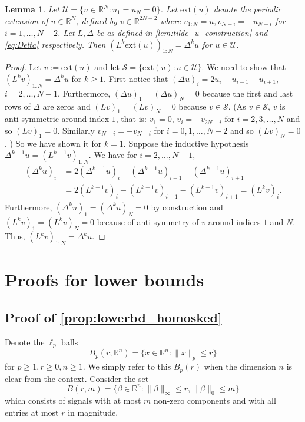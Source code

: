 \documentclass[ejs,noshowframe]{imsart}
\theoremstyle{plain}
\newtheorem{lemma}[theorem]{Lemma}
\theoremstyle{definition}
\newcommand{\R}{\mathbb{R}}
\newcommand{\cS}{\mathcal{S}}
\newcommand{\cU}{\mathcal{U}}
\begin{document}
\begin{appendix}
\begin{lemma}
	\label{lem:L_Delta_on_U}
	Let $\cU = \{ u \in \R^N: u_1 = u_N = 0 \}$.
	Let $\mathrm{ext}(u)$ denote the periodic extension of $u \in \R^N$,
	defined by $v \in \R^{2N-2}$ where $ v_{1:N} = u, v_{N+i} = -u_{N-i}$ for 
	$i=1,\dots,N-2$.
	Let $L, \Delta$ be as defined in \autoref{lem:tilde_u_construction} and 
	\eqref{eq:Delta} respectively.
	Then $(L^k \mathrm{ext}(u))_{1:N} = \Delta^k u$ for $u \in \cU$.
\end{lemma}
\begin{proof}
	Let $v := \mathrm{ext}(u)$ and let $\cS = \{ \mathrm{ext}(u) : u \in \cU\}$.
	We need to show that $(L^k v)_{1:N} = \Delta^k u$ 
	for $k \ge 1$.
	First notice that $(\Delta u)_i = 2u_i - u_{i-1} 
	- u_{i+1}$, $i=2,\ldots, N-1$.
	Furthermore, $(\Delta u)_1 = (\Delta u)_{N} = 0$ because the first and last 
	rows of $\Delta$ are zeros
	and $(Lv)_1 = (Lv)_N = 0$ because $v \in \cS$.
	(As $v \in \cS$, $v$ is anti-symmetric around index $1$, that is:
		$v_1 = 0$, $v_{i} = -v_{2N-i}$ for $i=2,3,\dots, N$ and so $(Lv)_1 = 0$.
		Similarly 
		$v_{N-i} = -v_{N+i}$ for $i=0, 1,\dots, N-2$ and so $(Lv)_{N} = 0$.
	)
	So we have shown it for $k=1$.
	Suppose the inductive hypothesis $\Delta^{k-1}  u = (L^{k-1} v)_{1:N}$.
	We have for $i=2,\ldots, N-1$,
	\begin{align}
	(\Delta^{k}  u)_i 
	&= 2(\Delta^{k-1} u)_i - (\Delta^{k-1} u)_{i-1} - (\Delta^{k-1} u)_{i+1} \\
	&= 2 (L^{k-1} v)_i - (L^{k-1} v)_{i-1} - (L^{k-1} v)_{i+1}  
	= (L^k v)_i.
	\end{align}
	Furthermore, $(\Delta^k u)_1 = (\Delta^k u)_N = 0$ by construction
	and $(L^k v)_1 = (L^k v)_N = 0$ because of anti-symmetry of $v$ around 
	indices $1$ and $N$.
	Thus, $(L^k v)_{1:N} = \Delta^k u$.
\end{proof}
\section{Proofs for lower bounds}

\subsection{Proof of \autoref{prop:lowerbd_homosked}}
\label{sec:lowerbd_homosked_proof}
Denote the $\ell_p$ balls
\begin{equation}
	\label{eq:lp_ball}
	B_p(r; \R^n) = \{ x \in \R^n : \| x \|_p \leq r\}
\end{equation}
for $p \ge 1, r \ge 0, n \ge 1$. We simply refer to this $B_p(r)$ when the
dimension $n$ is clear from the context.
Consider the set 
\begin{equation}
\label{eq:B_r_m}
B(r,m) = \big\{ \beta \in \R^n : \| \beta \|_\infty \leq r, \|\beta\|_0 \leq m 
\big\}
\end{equation}
which consists of signals with at most $m$ non-zero components
and with all entries at most $r$ in magnitude.


\end{appendix}
\end{document}
